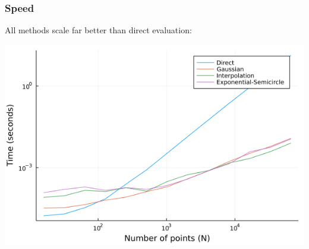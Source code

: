 \documentclass{beamer}
\begin{document}
\begin{frame}
  \frametitle{Speed}
  All methods scale far better than direct evaluation:

  \vfill

  \centering \includegraphics[width=.8\textwidth]{images/n_vs_time.png}

\end{frame}

\end{document}
